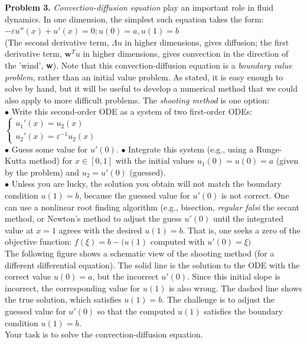\documentclass[14pt,a4paper]{article}
\begin{document}
\label{Problem 3}
\large\textbf{Problem 3.} \textit{Convection-diffusion equation} play an important role in fluid dynamics. In one dimension, the simplest such equation takes the form: $-\varepsilon u''(x) + u'(x) = 0; u(0) = a, u(1) = b$\\
(The second derivative term, $\Lambda u$ in higher dimensions, gives diffusion; the first derivative term, $\textbf{w}^Tu$ in higher dimensions, gives convection in the direction of the 'wind', \textbf{w}).
Note that this convection-diffusion equation is a \textit{boundary value problem}, rather than an initial value problem. As stated, it is easy enough to solve by hand, but it will be useful to develop a numerical method that we could also apply to more difficult problems. The \textit{shooting method} is one option:\\
$\bullet$ Write this second-order ODE as a system of two first-order ODEs: $\begin{cases} u_1'(x) = u_2(x) \\ u_2'(x) = \varepsilon^{-1}u_2(x) \end{cases}$\\
$\bullet$ Guess some value for $u'(0)$.
$\bullet$ Integrate this system (e.g., using a Runge-Kutta method) for $x \in [0,1]$ with the initial values $u_1(0) = u(0) = a$ (given by the problem) and $u_2 = u'(0)$ (guessed).\\
$\bullet$ Unless you are lucky, the solution you obtain will not match the boundary condition $u(1) = b$, because the guessed value for $u'(0)$ is not correct. One can use a nonlinear root finding algorithm (e.g., bisection, \textit{regular falsi} the secant method, or Newton's method to adjust the guess $u'(0)$ until the integrated value at $x = 1$ agrees with the desired $u(1) = b$. That is, one seeks a zero of the objective function: $f(\xi) = b-(u(1)$ computed with $u'(0) = \xi)$\\
The following figure shows a schematic view of the shooting method (for a different differential equation). The solid line is the solution to the ODE with the correct value $u(0) = a$, but the incorrect $u'(0)$. Since this initial slope is incorrect, the corresponding value for $u(1)$ is also wrong. The dashed line shows the true solution, which satisfies $u(1) = b$. The challenge is to adjust the guessed value for $u'(0)$ so that the computed $u(1)$ satisfies the boundary condition $u(1) = b$.\\
Your task is to solve the convection-diffusion equation.
\end{document}
